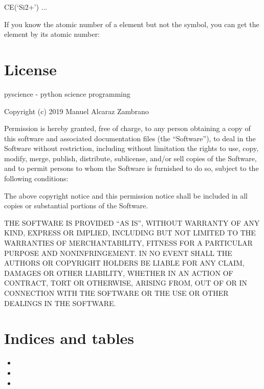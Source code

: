 \documentclass[letterpaper,10pt,english]{sphinxmanual}
\begin{document}
\begin{sphinxVerbatim}[commandchars=\\\{\}]
\PYGZgt{} CE(‘Si2+’)
...
\end{sphinxVerbatim}

If you know the atomic number of a element but not the symbol, you can get the
element by its atomic number:

\begin{sphinxVerbatim}[commandchars=\\\{\}]
 
\end{sphinxVerbatim}


\chapter{License}
\label{\detokenize{license:license}}\label{\detokenize{license::doc}}
pyscience - python science programming

Copyright (c) 2019 Manuel Alcaraz Zambrano

Permission is hereby granted, free of charge, to any person obtaining a copy
of this software and associated documentation files (the “Software”), to deal
in the Software without restriction, including without limitation the rights
to use, copy, modify, merge, publish, distribute, sublicense, and/or sell
copies of the Software, and to permit persons to whom the Software is
furnished to do so, subject to the following conditions:

The above copyright notice and this permission notice shall be included in all
copies or substantial portions of the Software.

THE SOFTWARE IS PROVIDED “AS IS”, WITHOUT WARRANTY OF ANY KIND, EXPRESS OR
IMPLIED, INCLUDING BUT NOT LIMITED TO THE WARRANTIES OF MERCHANTABILITY,
FITNESS FOR A PARTICULAR PURPOSE AND NONINFRINGEMENT. IN NO EVENT SHALL THE
AUTHORS OR COPYRIGHT HOLDERS BE LIABLE FOR ANY CLAIM, DAMAGES OR OTHER
LIABILITY, WHETHER IN AN ACTION OF CONTRACT, TORT OR OTHERWISE, ARISING FROM,
OUT OF OR IN CONNECTION WITH THE SOFTWARE OR THE USE OR OTHER DEALINGS IN THE
SOFTWARE.


\chapter{Indices and tables}
\label{\detokenize{index:indices-and-tables}}\begin{itemize}
\item {} 

\item {} 

\item {} 

\end{itemize}



\renewcommand{\indexname}{Index}
\printindex
\end{document}
